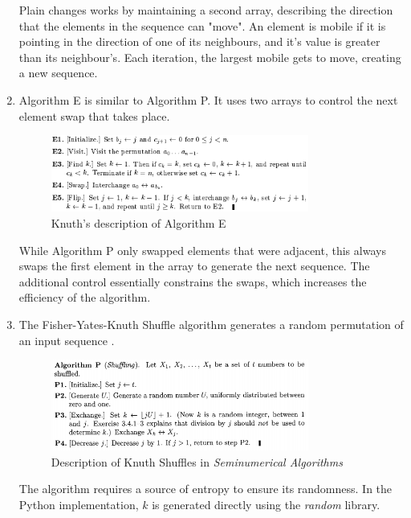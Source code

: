 \documentclass[12pt]{article}
\begin{document}
\begin{enumerate}
Plain changes works by maintaining a second array, describing the direction that the elements in the sequence can "move". An element is mobile if it is pointing in the direction of one of its neighbours, and it's value is greater than its neighbour's. Each iteration, the largest mobile gets to move, creating a new sequence.

\item Algorithm E is similar to Algorithm P. It uses two arrays to control the next element swap that takes place. 

\begin{figure}[h]
\centering
\includegraphics[width=0.8\textwidth]{images/perm_E.PNG}
\caption{Knuth's description of Algorithm E \cite{perm_E}}
\end{figure}

While Algorithm P only swapped elements that were adjacent, this always swaps the first element in the array to generate the next sequence. The additional control essentially constrains the swaps, which increases the efficiency of the algorithm.

\item The Fisher-Yates-Knuth Shuffle algorithm generates a random permutation of an input sequence \cite{rand_perm}\cite{knuth_shuffle}.

\begin{figure}[h]
\centering
\includegraphics[width=0.8\textwidth]{images/rand_perm.PNG}
\caption{Description of Knuth Shuffles in \textit{Seminumerical Algorithms} \cite{knuth_shuffle}}
\end{figure}

The algorithm requires a source of entropy to ensure its randomness. In the Python implementation, \(k\) is generated directly using the \textit{random} library.

\end{enumerate}
\end{document}
